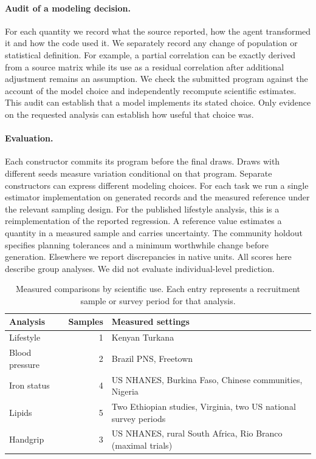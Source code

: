 \documentclass[sigconf,anonymous,review]{acmart}
\begin{document}
\paragraph{Audit of a modeling decision.}
For each quantity we record what the source reported, how the agent transformed it and how the code used it. We separately record any change of population or statistical definition. For example, a partial correlation can be exactly derived from a source matrix while its use as a residual correlation after additional adjustment remains an assumption. We check the submitted program against the account of the model choice and independently recompute scientific estimates. This audit can establish that a model implements its stated choice. Only evidence on the requested analysis can establish how useful that choice was.

\paragraph{Evaluation.}
Each constructor commits its program before the final draws. Draws with different seeds measure variation conditional on that program. Separate constructors can express different modeling choices. For each task we run a single estimator implementation on generated records and the measured reference under the relevant sampling design. For the published lifestyle analysis, this is a reimplementation of the reported regression. A reference value estimates a quantity in a measured sample and carries uncertainty. The community holdout specifies planning tolerances and a minimum worthwhile change before generation. Elsewhere we report discrepancies in native units. All scores here describe group analyses. We did not evaluate individual-level prediction.

\begin{table}[t]
\caption{Measured comparisons by scientific use. Each entry represents a recruitment sample or survey period for that analysis.}
\label{tab:scope}
\small\centering
\begin{tabular}{@{}lrp{}@{}}
\toprule
Analysis & Samples & Measured settings\\
\midrule
Lifestyle & 1 & Kenyan Turkana\\
Blood pressure & 2 & Brazil PNS, Freetown\\
Iron status & 4 & US NHANES, Burkina Faso, Chinese communities, Nigeria\\
Lipids & 5 & Two Ethiopian studies, Virginia, two US national survey periods\\
Handgrip & 3 & US NHANES, rural South Africa, Rio Branco (maximal trials)\\
\bottomrule
\end{tabular}
\end{table}
\end{document}

